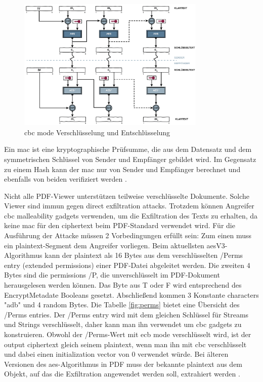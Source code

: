 \begin{figure}[!htb]
	\centering
	\includegraphics[width=0.8\textwidth]{"images/cbc.png"}
	\caption{\gls{cbc} mode Verschlüsselung und Entschlüsselung \cite{cbc}}
	\label{fig:cbc}
\end{figure}

Ein \gls{mac} ist eine kryptographische Prüfsumme, die aus dem Datensatz und dem symmetrischen Schlüssel von Sender und Empfänger gebildet wird. Im Gegensatz zu einem Hash kann der \gls{mac} nur von Sender und Empfänger berechnet und ebenfalls von beiden verifiziert werden \cite{crypto-web}.
\par
Nicht alle PDF-Viewer unterstützen teilweise verschlüsselte Dokumente. Solche Viewer sind immun gegen direct exfiltration attacks. Trotzdem können Angreifer \gls{cbc} malleability gadgets verwenden, um die Exfiltration des Texts zu erhalten, da keine \gls{mac} für den ciphertext beim PDF-Standard verwendet wird. Für die Ausführung der Attacke müssen 2 Vorbedingungen erfüllt sein: Zum einen muss ein plaintext-Segment dem Angreifer vorliegen. Beim aktuellsten \gls{aes}V3-Algorithmus kann der plaintext als 16 Bytes aus dem verschlüsselten /Perms entry (extended permissions) einer PDF-Datei abgeleitet werden. Die zweiten 4 Bytes sind die permissions /P, die unverschlüsselt im PDF-Dokument herausgelesen werden können. Das Byte aus T oder F wird entsprechend des EncryptMetadate Booleans gesetzt. Abschließend kommen 3 Konstante characters "adb" und 4 random Bytes. Die Tabelle \ref{fig:perms} bietet eine Übersicht des /Perms entries. Der /Perms entry wird mit dem gleichen Schlüssel für Streams und Strings verschlüsselt, daher kann man ihn verwendet um \gls{cbc} gadgets zu konstruieren. Obwohl der /Perms-Wert mit \gls{ecb} mode verschlüsselt wird, ist der output ciphertext gleich seinem plaintext, wenn man ihn mit \gls{cbc} verschlüsselt und dabei einen initialization vector von 0 verwendet würde. Bei älteren Versionen des \gls{aes}-Algorithmus in PDF muss der bekannte plaintext aus dem Objekt, auf das die Exfiltration angewendet werden soll, extrahiert werden \cite{ccc-break-pdf, pdfex}.
\par

